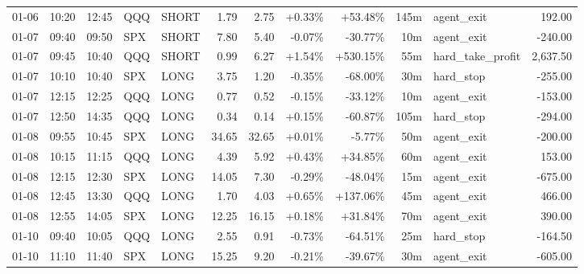 \documentclass[11pt,a4paper,twoside]{article}
\begin{document}
\begin{center}
\begin{longtable}{>{\color{txtmain}}l l l l l r r r r r >{\color{txtmain}}l r}
01-06 & 10:20 & 12:45 & QQQ & SHORT & 1.79 & 2.75 & \textcolor{wingreen}{+0.33\%} & \textcolor{wingreen}{+53.48\%} & 145m & agent\_exit & \textcolor{wingreen}{192.00} \\
01-07 & 09:40 & 09:50 & SPX & SHORT & 7.80 & 5.40 & \textcolor{lossred}{-0.07\%} & \textcolor{lossred}{-30.77\%} & 10m & agent\_exit & \textcolor{lossred}{-240.00} \\
01-07 & 09:45 & 10:40 & QQQ & SHORT & 0.99 & 6.27 & \textcolor{wingreen}{+1.54\%} & \textcolor{wingreen}{+530.15\%} & 55m & hard\_take\_profit & \textcolor{wingreen}{2,637.50} \\
01-07 & 10:10 & 10:40 & SPX & LONG & 3.75 & 1.20 & \textcolor{lossred}{-0.35\%} & \textcolor{lossred}{-68.00\%} & 30m & hard\_stop & \textcolor{lossred}{-255.00} \\
01-07 & 12:15 & 12:25 & QQQ & LONG & 0.77 & 0.52 & \textcolor{lossred}{-0.15\%} & \textcolor{lossred}{-33.12\%} & 10m & agent\_exit & \textcolor{lossred}{-153.00} \\
01-07 & 12:50 & 14:35 & QQQ & LONG & 0.34 & 0.14 & \textcolor{wingreen}{+0.15\%} & \textcolor{lossred}{-60.87\%} & 105m & hard\_stop & \textcolor{lossred}{-294.00} \\
01-08 & 09:55 & 10:45 & SPX & LONG & 34.65 & 32.65 & \textcolor{wingreen}{+0.01\%} & \textcolor{lossred}{-5.77\%} & 50m & agent\_exit & \textcolor{lossred}{-200.00} \\
01-08 & 10:15 & 11:15 & QQQ & LONG & 4.39 & 5.92 & \textcolor{wingreen}{+0.43\%} & \textcolor{wingreen}{+34.85\%} & 60m & agent\_exit & \textcolor{wingreen}{153.00} \\
01-08 & 12:15 & 12:30 & SPX & LONG & 14.05 & 7.30 & \textcolor{lossred}{-0.29\%} & \textcolor{lossred}{-48.04\%} & 15m & agent\_exit & \textcolor{lossred}{-675.00} \\
01-08 & 12:45 & 13:30 & QQQ & LONG & 1.70 & 4.03 & \textcolor{wingreen}{+0.65\%} & \textcolor{wingreen}{+137.06\%} & 45m & agent\_exit & \textcolor{wingreen}{466.00} \\
01-08 & 12:55 & 14:05 & SPX & LONG & 12.25 & 16.15 & \textcolor{wingreen}{+0.18\%} & \textcolor{wingreen}{+31.84\%} & 70m & agent\_exit & \textcolor{wingreen}{390.00} \\
01-10 & 09:40 & 10:05 & QQQ & LONG & 2.55 & 0.91 & \textcolor{lossred}{-0.73\%} & \textcolor{lossred}{-64.51\%} & 25m & hard\_stop & \textcolor{lossred}{-164.50} \\
01-10 & 11:10 & 11:40 & SPX & LONG & 15.25 & 9.20 & \textcolor{lossred}{-0.21\%} & \textcolor{lossred}{-39.67\%} & 30m & agent\_exit & \textcolor{lossred}{-605.00} \\

\end{longtable}
\end{center}
\end{document}
